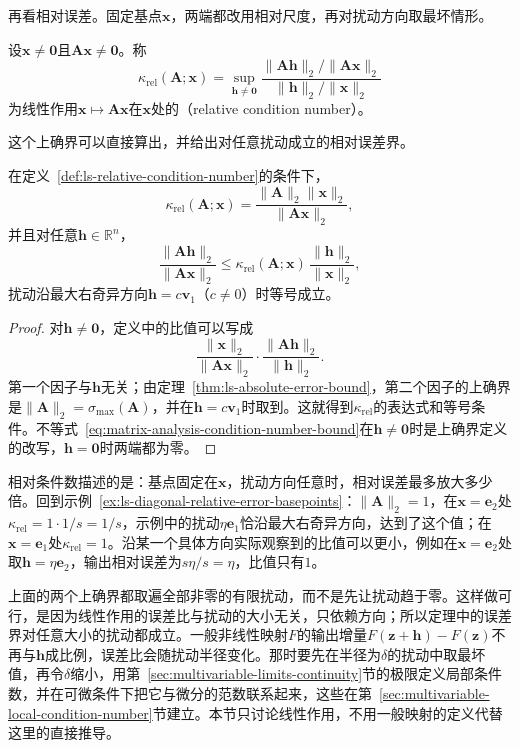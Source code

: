 再看相对误差。固定基点$\bm x$，两端都改用相对尺度，再对扰动方向取最坏情形。
\begin{definition}[线性作用的相对条件数]
\label{def:ls-relative-condition-number}
设$\bm x\neq\bm0$且$\bm A\bm x\neq\bm0$。称
\[
 \kappa_{\mathrm{rel}}(\bm A;\bm x)
 =\sup_{\bm h\neq\bm0}
 \frac{\lVert\bm A\bm h\rVert_2/\lVert\bm A\bm x\rVert_2}
      {\lVert\bm h\rVert_2/\lVert\bm x\rVert_2}
\]
为线性作用$\bm x\mapsto\bm A\bm x$在$\bm x$处的（relative condition number）。
\end{definition}
这个上确界可以直接算出，并给出对任意扰动成立的相对误差界。
\begin{theorem}[相对条件数与相对误差界]
\label{thm:ls-relative-condition-number}
在定义~\ref{def:ls-relative-condition-number}的条件下，
\[
 \kappa_{\mathrm{rel}}(\bm A;\bm x)=\frac{\lVert\bm A\rVert_2\lVert\bm x\rVert_2}{\lVert\bm A\bm x\rVert_2},
\]
并且对任意$\bm h\in\mathbb R^n$，
\begin{equation}
 \frac{\lVert\bm A\bm h\rVert_2}{\lVert\bm A\bm x\rVert_2}
 \leq\kappa_{\mathrm{rel}}(\bm A;\bm x)\,\frac{\lVert\bm h\rVert_2}{\lVert\bm x\rVert_2},
 \label{eq:matrix-analysis-condition-number-bound}
\end{equation}
扰动沿最大右奇异方向$\bm h=c\bm v_1$（$c\neq0$）时等号成立。
\end{theorem}
\begin{proof}
对$\bm h\neq\bm0$，定义中的比值可以写成
\[
 \frac{\lVert\bm x\rVert_2}{\lVert\bm A\bm x\rVert_2}\cdot
 \frac{\lVert\bm A\bm h\rVert_2}{\lVert\bm h\rVert_2}.
\]
第一个因子与$\bm h$无关；由定理~\ref{thm:ls-absolute-error-bound}，第二个因子的上确界是$\lVert\bm A\rVert_2=\sigma_{\max}(\bm A)$，并在$\bm h=c\bm v_1$时取到。这就得到$\kappa_{\mathrm{rel}}$的表达式和等号条件。不等式~\eqref{eq:matrix-analysis-condition-number-bound}在$\bm h\neq\bm0$时是上确界定义的改写，$\bm h=\bm0$时两端都为零。
\end{proof}
相对条件数描述的是：基点固定在$\bm x$，扰动方向任意时，相对误差最多放大多少倍。回到示例~\ref{ex:ls-diagonal-relative-error-basepoints}：$\lVert\bm A\rVert_2=1$，在$\bm x=\bm e_2$处$\kappa_{\mathrm{rel}}=1\cdot1/s=1/s$，示例中的扰动$\eta\bm e_1$恰沿最大右奇异方向，达到了这个值；在$\bm x=\bm e_1$处$\kappa_{\mathrm{rel}}=1$。沿某一个具体方向实际观察到的比值可以更小，例如在$\bm x=\bm e_2$处取$\bm h=\eta\bm e_2$，输出相对误差为$s\eta/s=\eta$，比值只有$1$。

上面的两个上确界都取遍全部非零的有限扰动，而不是先让扰动趋于零。这样做可行，是因为线性作用的误差比与扰动的大小无关，只依赖方向；所以定理中的误差界对任意大小的扰动都成立。一般非线性映射$F$的输出增量$F(\bm z+\bm h)-F(\bm z)$不再与$\bm h$成比例，误差比会随扰动半径变化。那时要先在半径为$\delta$的扰动中取最坏值，再令$\delta$缩小，用第~\ref{sec:multivariable-limits-continuity}节的极限定义局部条件数，并在可微条件下把它与微分的范数联系起来，这些在第~\ref{sec:multivariable-local-condition-number}节建立。本节只讨论线性作用，不用一般映射的定义代替这里的直接推导。

